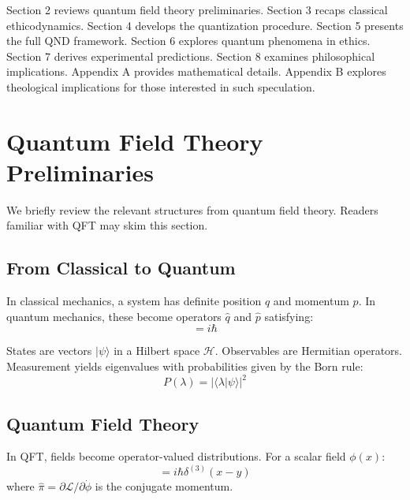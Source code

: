 \documentclass[12pt]{article}
\begin{document}
Section 2 reviews quantum field theory preliminaries. Section 3 recaps classical ethicodynamics. Section 4 develops the quantization procedure. Section 5 presents the full QND framework. Section 6 explores quantum phenomena in ethics. Section 7 derives experimental predictions. Section 8 examines philosophical implications. Appendix A provides mathematical details. Appendix B explores theological implications for those interested in such speculation.

\section{Quantum Field Theory Preliminaries}

We briefly review the relevant structures from quantum field theory. Readers familiar with QFT may skim this section.

\subsection{From Classical to Quantum}

In classical mechanics, a system has definite position $q$ and momentum $p$. In quantum mechanics, these become operators $\hat{q}$ and $\hat{p}$ satisfying:
\begin{equation}
    [\hat{q}, \hat{p}] = i\hbar
\end{equation}

States are vectors $|\psi\rangle$ in a Hilbert space $\mathcal{H}$. Observables are Hermitian operators. Measurement yields eigenvalues with probabilities given by the Born rule:
\begin{equation}
    P(\lambda) = |\langle \lambda | \psi \rangle|^2
\end{equation}

\subsection{Quantum Field Theory}

In QFT, fields become operator-valued distributions. For a scalar field $\phi(x)$:
\begin{equation}
    [\hat{\phi}(x), \hat{\pi}(y)] = i\hbar \delta^{(3)}(x - y)
\end{equation}
where $\hat{\pi} = \partial \mathcal{L} / \partial \dot{\phi}$ is the conjugate momentum.
\end{document}
